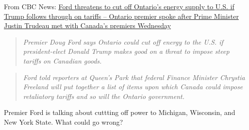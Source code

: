 From CBC News:
\href{https://www.cbc.ca/news/canada/toronto/doug-ford-ontario-premiers-meet-justin-trudeau-1.7407948}{Ford threatens to cut off Ontario's energy supply to U.S. if Trump follows through on tariffs -- Ontario premier spoke after Prime Minister Justin Trudeau met with Canada's premiers Wednesday}

\begin{quote}
\emph{Premier Doug Ford says Ontario could cut off energy to the U.S. if president-elect Donald Trump makes good on a threat to impose steep tariffs on Canadian goods.}
\end{quote}

\begin{quote}
\emph{Ford told reporters at Queen's Park that federal Finance Minister Chrystia Freeland will put together a list of items upon which Canada could impose retaliatory tariffs and so will the Ontario government.}
\end{quote}

Premier Ford is talking about cuttting off power to Michigan, Wisconsin,
and New York State. What could go wrong?
